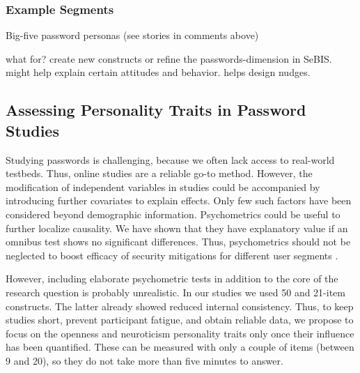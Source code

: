 
\subsubsection{Example Segments}

Big-five password personas (see stories in comments above)

what for? create new constructs or refine the passwords-dimension in SeBIS. might help explain certain attitudes and behavior. helps design nudges.




\subsection{Assessing Personality Traits in Password Studies}
Studying passwords is challenging, because we often lack access to real-world testbeds. Thus, online studies are a reliable go-to method. However, the modification of independent variables in studies could be accompanied by introducing further covariates to explain effects. Only few such factors have been considered beyond demographic information. Psychometrics could be useful to further localize causality. We have shown that they have explanatory value if an omnibus test shows no significant differences. Thus, psychometrics should not be neglected to boost efficacy of security mitigations for different user segments \cite{Egelman2015AverageUser}. 

However, including elaborate psychometric tests in addition to the core of the research question is probably unrealistic. In our studies we used 50 and 21-item constructs. The latter already showed reduced internal consistency. Thus, to keep studies short, prevent participant fatigue, and obtain reliable data, we propose to focus on the openness and neuroticism personality traits only once their influence has been quantified. These can be measured with only a couple of items (between 9 and 20), so they do not take more than five minutes to answer. 


